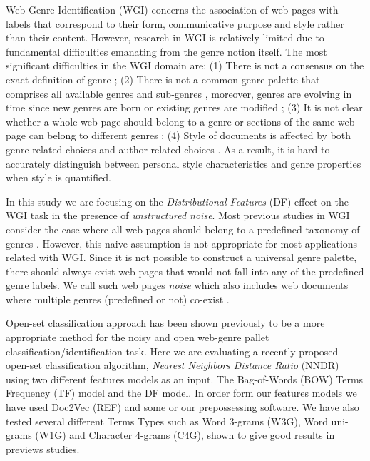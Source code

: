 \documentclass[runningheads]{llncs}
\begin{document}
Web Genre Identification (WGI) concerns the association of web pages with labels that correspond to their form, communicative purpose and style rather than their content. However, research in WGI is relatively limited due to fundamental difficulties emanating from the genre notion itself. The most significant difficulties in the WGI domain are: (1) There is not a consensus on the exact definition of genre \citep{crowston2011problems}; (2) There is not a common genre palette that comprises all available genres and sub-genres \citep{santini2011cross,mehler2010genres_on_web,mason2009n,sharoff2010web}, moreover, genres are evolving in time since new genres are born or existing genres are modified \citep{Boese2005}; (3) It is not clear whether a whole web page should belong to a genre or sections of the same web page can belong to different genres \citep{jebari2015combination,madjarov2015web}; (4) Style of documents is affected by both genre-related choices and author-related choices \citep{petrenz2011stable,Sharroff2010}. As a result, it is hard to accurately distinguish between personal style characteristics and genre properties when style is quantified.

In this study we are focusing on the \textit{Distributional Features} (DF) effect on the WGI task in the presence of \textit{unstructured noise}. Most previous studies in WGI consider the case where all web pages should belong to a predefined taxonomy of genres \citep{Lim2005,santini2007automatic,kanaris2009learning,jebari2014pure_URL}. However, this naive assumption is not appropriate for most applications related with WGI. Since it is not possible to construct a universal genre palette, there should always exist web pages that would not fall into any of the predefined genre labels. We call such web pages \textit{noise} which also includes web documents where multiple genres (predefined or not) co-exist \citep{santini2011cross,levering2008using}. 

Open-set classification approach has been shown previously to be a more appropriate method \cite{pritsos2018open,pritsos2015clef} for the noisy and open web-genre pallet classification/identification task. Here we are evaluating a recently-proposed open-set classification algorithm, \textit{Nearest Neighbors Distance Ratio} (NNDR) using two different features models as an input. The Bag-of-Words (BOW) Terms Frequency (TF) model and the DF model. In order form our features models we have used Doc2Vec (REF) and some or our prepossessing software. We have also tested several different Terms Types such as Word 3-grams (W3G), Word uni-grams (W1G) and Character 4-grams (C4G), shown to give good results in previews studies.
\end{document}
